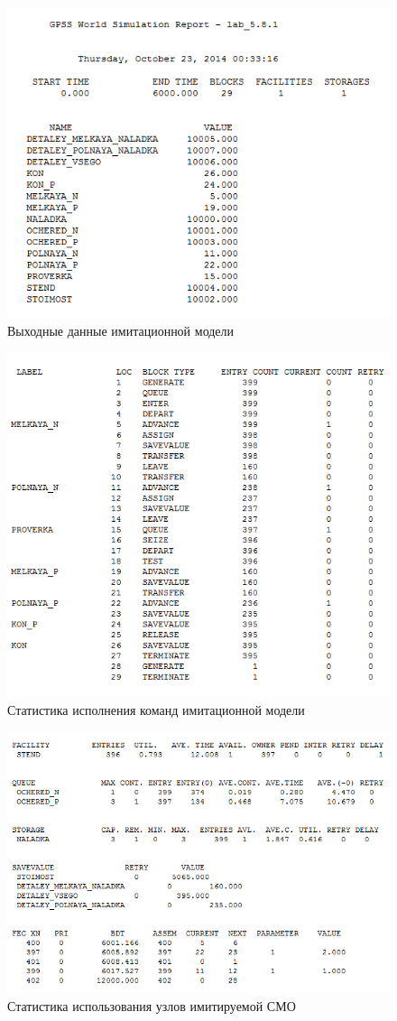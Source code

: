 \begin{figure}[h!]
  \centering
  \includegraphics[width=0.75\linewidth]{pic/report_1}
  \caption{Выходные данные имитационной модели}
  \label{pic:report_1}
\end{figure}

\begin{figure}[h!]
  \centering
  \includegraphics[width=0.75\linewidth]{pic/report_2}
  \caption{Статистика исполнения команд имитационной модели}
  \label{pic:report_2}
\end{figure}

\newpage

\begin{figure}[h!]
  \centering
  \includegraphics[width=0.9\linewidth]{pic/report_3}
  \caption{Статистика использования узлов имитируемой СМО}
  \label{pic:report_3}
\end{figure}

